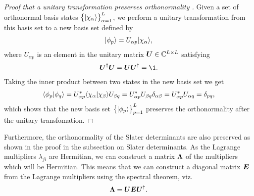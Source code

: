         \begin{proof}[%
                Proof that a unitary transformation preserves orthonormality%
        ]
            Given a set of orthonormal basis states
            $\left\{ | \chi_{\alpha} \rangle \right\}_{\alpha = 1}^{L}$,
            we perform a unitary transformation from this basis set to a new
            basis set defined by
            \begin{align}
                | \phi_p \rangle = U_{\alpha p}| \chi_{\alpha} \rangle,
            \end{align}
            where $U_{\alpha p}$ is an element in the unitary matrix $\boldsymbol{U} \in
            \mathbb{C}^{L \times L}$ satisfying
            \begin{align}
                \vfg{U}^{\dagger}\vfg{U} = \vfg{U}\vfg{U}^{\dagger} = \1.
            \end{align}
            Taking the inner product between two states in the new basis set we
            get
            \begin{align}
                \langle \phi_p | \phi_q \rangle
                = U^{*}_{\alpha p}
                \langle \chi_{\alpha} | \chi_{\beta} \rangle
                U_{\beta q}
                = U^{*}_{\alpha p} U_{\beta q} \delta_{\alpha \beta}
                = U^{*}_{\alpha p} U_{\alpha q}
                = \delta_{pq},
            \end{align}
            which shows that the new basis set $\left\{ | \phi_p \rangle \right\}_{p = 1}^L$
            preserves the orthonormality after the unitary transfomation.
        \end{proof}
        Furthermore, the orthonormality of the Slater determinants are also
        preserved as shown in the proof in the subsection on Slater determinants.
        As the Lagrange multipliers $\lambda_{ji}$ are Hermitian, we can
        construct a matrix $\boldsymbol{\Lambda}$ of the multipliers which will be
        Hermitian.
        This means that we can construct a diagonal matrix $\boldsymbol{E}$ from
        the Lagrange multipliers using the spectral theorem, viz.
        \begin{align}
            \boldsymbol{\Lambda} = \boldsymbol{U} \boldsymbol{E} \boldsymbol{U}^{\dagger}.
        \end{align}


